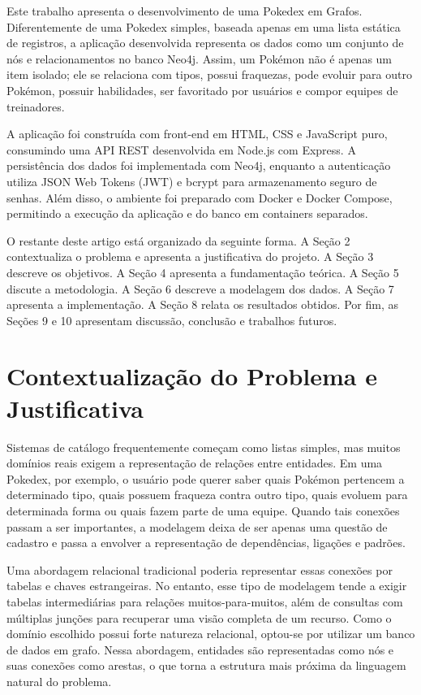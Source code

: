 \documentclass[12pt]{article}
\begin{document}
Este trabalho apresenta o desenvolvimento de uma Pokedex em Grafos. Diferentemente de uma Pokedex simples, baseada apenas em uma lista estática de registros, a aplicação desenvolvida representa os dados como um conjunto de nós e relacionamentos no banco Neo4j. Assim, um Pokémon não é apenas um item isolado; ele se relaciona com tipos, possui fraquezas, pode evoluir para outro Pokémon, possuir habilidades, ser favoritado por usuários e compor equipes de treinadores.

A aplicação foi construída com front-end em HTML, CSS e JavaScript puro, consumindo uma API REST desenvolvida em Node.js com Express. A persistência dos dados foi implementada com Neo4j, enquanto a autenticação utiliza JSON Web Tokens (JWT) e bcrypt para armazenamento seguro de senhas. Além disso, o ambiente foi preparado com Docker e Docker Compose, permitindo a execução da aplicação e do banco em containers separados.

O restante deste artigo está organizado da seguinte forma. A Seção 2 contextualiza o problema e apresenta a justificativa do projeto. A Seção 3 descreve os objetivos. A Seção 4 apresenta a fundamentação teórica. A Seção 5 discute a metodologia. A Seção 6 descreve a modelagem dos dados. A Seção 7 apresenta a implementação. A Seção 8 relata os resultados obtidos. Por fim, as Seções 9 e 10 apresentam discussão, conclusão e trabalhos futuros.

\section{Contextualização do Problema e Justificativa}

Sistemas de catálogo frequentemente começam como listas simples, mas muitos domínios reais exigem a representação de relações entre entidades. Em uma Pokedex, por exemplo, o usuário pode querer saber quais Pokémon pertencem a determinado tipo, quais possuem fraqueza contra outro tipo, quais evoluem para determinada forma ou quais fazem parte de uma equipe. Quando tais conexões passam a ser importantes, a modelagem deixa de ser apenas uma questão de cadastro e passa a envolver a representação de dependências, ligações e padrões.

Uma abordagem relacional tradicional poderia representar essas conexões por tabelas e chaves estrangeiras. No entanto, esse tipo de modelagem tende a exigir tabelas intermediárias para relações muitos-para-muitos, além de consultas com múltiplas junções para recuperar uma visão completa de um recurso. Como o domínio escolhido possui forte natureza relacional, optou-se por utilizar um banco de dados em grafo. Nessa abordagem, entidades são representadas como nós e suas conexões como arestas, o que torna a estrutura mais próxima da linguagem natural do problema.
\end{document}
